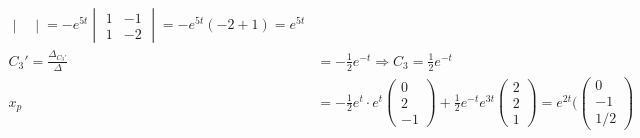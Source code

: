 \documentclass{article}
\begin{document}
\begin{align*}
\begin{vmatrix}
                                               \end{vmatrix}=-e^{5t}\begin{vmatrix}
                                                                        1 & -1 \\
                                                                        1 & -2
                                                                    \end{vmatrix}=-e^{5t}(-2+1)=e^{5t}                                                                                  \\
    C_3'=\frac{\Delta_{C_3'}}{\Delta} & = -\frac{1}{2}e^{-t} \Rightarrow C_3=\frac{1}{2}e^{-t}                                                                                          \\
    x_p                               & = -\frac{1}{2}e^{t} \cdot e^t\begin{pmatrix}
                                                                         0 \\
                                                                         2 \\
                                                                         -1
                                                                     \end{pmatrix}  + \frac{1}{2}e^{-t} e^{3t}\begin{pmatrix}
                                                                                                                  2 \\
                                                                                                                  2 \\
                                                                                                                  1
                                                                                                              \end{pmatrix} = e^{2t}(\begin{pmatrix}
                                                                                                                                         0  \\
                                                                                                                                         -1 \\
                                                                                                                                         1/2

\end{pmatrix}
\end{align*}
\end{document}

